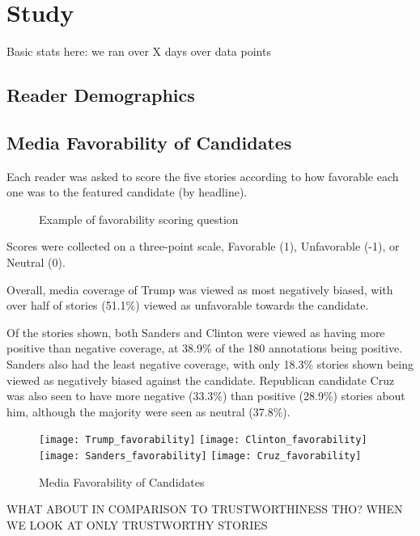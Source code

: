 \chapter{Study}
Basic stats here:
we ran over X days
over data points

\section{Reader Demographics}

\section{Media Favorability of Candidates}
Each reader was asked to score the five stories according to how favorable each one was to the featured candidate (by headline). 

\begin{figure}[h!] 
\centering
  \caption{Example of favorability scoring question}
\end{figure}
 
Scores were collected on a three-point scale, Favorable (1), Unfavorable (-1), or Neutral (0).

Overall, media coverage of Trump was viewed as most negatively biased, with over half of stories (51.1\%) viewed as unfavorable towards the candidate.

Of the stories shown, both Sanders and Clinton were viewed as having more positive than negative coverage, at 38.9\% of the 180 annotations being positive. Sanders also had the least negative coverage, with only 18.3\% stories shown being viewed as negatively biased against the candidate. Republican candidate Cruz was also seen to have more negative (33.3\%) than positive (28.9\%) stories about him, although the majority were seen as neutral (37.8\%).

\begin{figure}[h!] 
\centering
  \texttt{[image: Trump\_favorability]} 
  \texttt{[image: Clinton\_favorability]} 
  \texttt{[image: Sanders\_favorability]} 
  \texttt{[image: Cruz\_favorability]} 
  \caption{Media Favorability of Candidates}
\end{figure}
 


WHAT ABOUT IN COMPARISON TO TRUSTWORTHINESS THO?
WHEN WE LOOK AT ONLY TRUSTWORTHY STORIES

